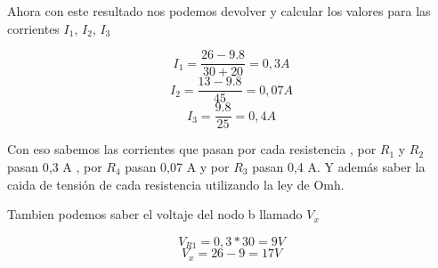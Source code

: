 \begin{example}
Ahora con este resultado nos podemos devolver y calcular los valores para las corrientes $I_1$, $I_2$, $I_3$

\begin {equation*}
 I_1 = \frac{26-9.8}{30+20} = 0,3 A
\end {equation*}
\begin {equation*}
 I_2 = \frac{13-9.8}{45} = 0,07 A
\end {equation*}
\begin {equation*}
 I_3 = \frac{9.8}{25} = 0,4 A
\end {equation*}

Con eso sabemos las corrientes que pasan por cada resistencia , por $R_1$ y  $R_2$ pasan 0,3 A , por $R_4$ pasan 0,07 A y por $R_3$ pasan 0,4 A. Y además saber la caida de tensión de cada resistencia utilizando la ley de Omh.

Tambien podemos saber el voltaje del nodo b llamado $V_x$

\begin {equation*}
 V_{R1} = 0,3*30 = 9 V
\end {equation*}
\begin {equation*}
 V_x = 26-9 = 17 V
\end {equation*}



\end{example}


